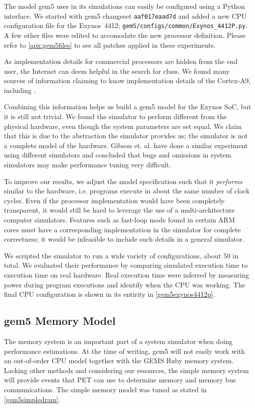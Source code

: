 The model gem5 uses in its simulations can easily be configured using a Python
interface. We started with gem5 changeset \texttt{aaf017eaad7d} and added a new
CPU configuration file for the Exynos~4412;
\texttt{gem5/configs/common/Exynos\_4412P.py}. A few other files were edited to
accomodate the new processor definition. Please refer to
\autoref{apx:gem5files} to see all patches applied in these experiments.

As implementation details for commercial processors are hidden from the end
user, the Internet can deem helpful in the search for clues. We found many
sources of information claiming to know implementation details of the Cortex-A9,
including
\cite{butko2012accuracy,blem2013detailed,armtech,exynoswiki,odroidwiki,geekland,7cpu,armcortexa9specs}.

Combining this information helps us build a gem5 model for the Exynos SoC, but
it is still not trivial.  We found the simulator to perform different from the
physical hardware, even though the system parameters are set equal. We claim
that this is due to the abstraction the simulator provides us; the simulator is
not a complete model of the hardware. Gibson et. al. \cite{gibson2000flash} have
done a similar experiment using different simulators and concluded that bugs and
omissions in system simulators may make performance tuning very difficult.

To improve our results, we adjust the model specification such that it
\textit{performs} similar to the hardware, i.e. programs execute in about the
same number of clock cycles. Even if the processor implementation would have
been completely transparent, it would still be hard to leverage the use of a
multi-architecture computer simulators. Features such as fast-loop mode found in
certain ARM cores must have a corresponding implementation in the simulator for
complete correctness; it would be infeasible to include such details in a
general simulator.

We scripted the simulator to run a wide variety of configurations, about $50$ in
total. We evaluated their performance by comparing simulated execution time to
execution time on real hardware. Real execution time were inferred by measuring
power during program executions and identify when the CPU was working. The final
CPU configuration is shown in its entirity in \autoref{gem5exynos4412p}.


\subsection{gem5 Memory Model}
The memory system is an important part of a
system simulator when doing performance estimations. At the time of writing,
gem5 will not easily work with an out-of-order CPU model together with the GEMS
Ruby memory system. Lacking other methods and considering our resources, the
simple memory system will provide events that PET can use to determine memory
and memory bus communications. The simple memory model was tuned as stated in
\autoref{gem5simpledram}.
